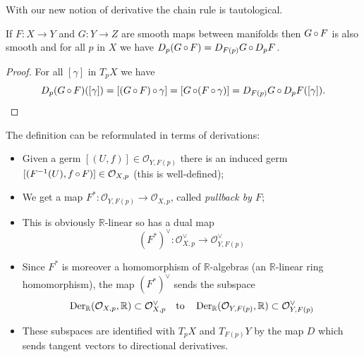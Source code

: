 \documentclass[a4paper,11pt]{article}
\begin{document}

	With our new notion of derivative the chain rule is tautological.

	\begin{prop}
		If $F: X \to Y$ and $G : Y \to Z$ are smooth maps between manifolds then $G \operatorname{\circ} F$ is also smooth and for all $p$ in $X$ we have $D_p(G \operatorname{\circ} F) = D_{F(p)}G\operatorname{\circ} D_p F$.
	\end{prop}
	\begin{proof}
		For all $[\gamma]$ in $T_p X$ we have
		\[
			D_p(G\operatorname{\circ} F) ([\gamma]) = [(G\operatorname{\circ} F)\operatorname{\circ} \gamma] = [G\operatorname{\circ}(F\operatorname{\circ} \gamma)] = D_{F(p)}G \operatorname{\circ} D_p F([\gamma]).
		\]
	\end{proof}

	The definition can be reformulated in terms of derivations:
	\begin{itemize}
		\item Given a germ $[(U,f)] \in \mathcal{O}_{Y,F(p)}$ there is an induced germ $[(F^{-1}(U), f\operatorname{\circ} F)] \in \mathcal{O}_{X,p}$ (this is well-defined);
		\item We get a map $F^* : \mathcal{O}_{Y,F(p)} \to \mathcal{O}_{X,p}$, called \emph{pullback by $F$};
		\item This is obviously $\mathbb{R}$-linear so has a dual map \[
			(F^*)^{\vee} : \mathcal{O}_{X,p}^{\vee} \to \mathcal{O}_{Y,F(p)}^{\vee}
		\]
		\item Since $F^*$ is moreover a homomorphism of $\mathbb{R}$-algebras (an $\mathbb{R}$-linear ring homomorphism), the map $(F^*)^{\vee}$ sends the subspace \[
			\operatorname{Der}_{\mathbb{R}}(\mathcal{O}_{X,p},\mathbb{R}) \subset \mathcal{O}_{X,p}^{\vee} \quad \text{to} \quad \operatorname{Der}_{\mathbb{R}}(\mathcal{O}_{Y,F(p)},\mathbb{R}) \subset \mathcal{O}_{Y,F(p)}^{\vee}
		\]
		\item These subspaces are identified with $T_p X$ and $T_{F(p)}Y$ by the map $D$ which sends tangent vectors to directional derivatives. 
		
		\begin{center}
		\end{center}
	\end{itemize}
\end{document}
